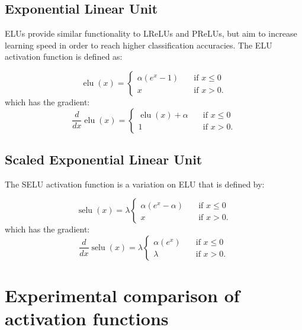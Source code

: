 \documentclass{article}
\DeclareMathOperator{\elu}{elu}
\DeclareMathOperator{\selu}{selu}
\begin{document}
\subsection{Exponential Linear Unit}

ELUs provide similar functionality to LReLUs and PReLUs, but aim to increase learning speed in order to reach higher classification accuracies\citep{clevert2015fast}. The ELU activation function is defined as:

\begin{equation}
  \elu(x) = 
  \begin{cases} 
    \alpha (e^{x} - 1)      & \quad \text{if } x \leq  0 \\
    x       & \quad \text{if } x > 0 .
  \end{cases}
\end{equation} 
which has the gradient:
\begin{equation}
  \frac{d}{dx} \elu(x) =
     \begin{cases} 
      \elu(x) + \alpha      & \quad \text{if } x \leq  0 \\
      1       & \quad \text{if } x > 0 .
    \end{cases} 
\end{equation}

\subsection{Scaled Exponential Linear Unit}

The SELU\citep{klambauer2017self} activation function is a variation on ELU that is defined by:

\begin{equation}
  \selu(x) = \lambda 
  \begin{cases} 
    \alpha (e^{x} - \alpha)      & \quad \text{if } x \leq  0 \\
    x       & \quad \text{if } x > 0 .
  \end{cases}
\end{equation} 
which has the gradient:
\begin{equation}
  \frac{d}{dx} \selu(x) = \lambda
     \begin{cases} 
      \alpha (e^{x})      & \quad \text{if } x \leq  0 \\
      \lambda       & \quad \text{if } x > 0 .
    \end{cases} 
\end{equation}

\section{Experimental comparison of activation functions}
\label{sec:actexpts}
\end{document}
